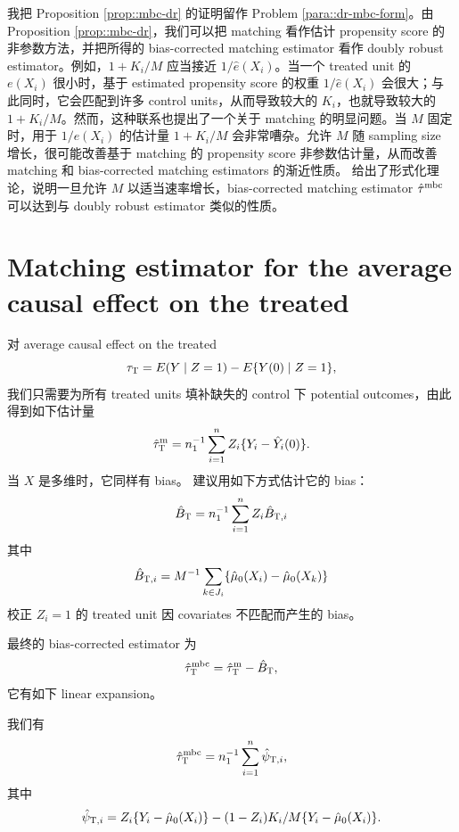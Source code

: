 我把 Proposition \ref{prop::mbc-dr} 的证明留作 Problem \ref{para::dr-mbc-form}。由 Proposition \ref{prop::mbc-dr}，我们可以把 matching 看作估计 propensity score 的非参数方法，并把所得的 bias-corrected matching estimator 看作 doubly robust estimator。例如，$1+K_i /  M$ 应当接近 $1/\hat{e}(X_i)$。当一个 treated unit 的 $e(X_i)$ 很小时，基于 estimated propensity score 的权重 $1/\hat{e}(X_i)$ 会很大；与此同时，它会匹配到许多 control units，从而导致较大的 $K_i$，也就导致较大的 $1+K_i /  M$。然而，这种联系也提出了一个关于 matching 的明显问题。当 $M$ 固定时，用于 $1/e(X_i)$ 的估计量 $1+K_i /  M$ 会非常嘈杂。允许 $M$ 随 sampling size 增长，很可能改善基于 matching 的 propensity score 非参数估计量，从而改善 matching 和 bias-corrected matching estimators 的渐近性质。\citet{lin2023estimation} 给出了形式化理论，说明一旦允许 $M$ 以适当速率增长，bias-corrected matching estimator $\hat{\tau}^\textup{mbc}   $ 可以达到与 doubly robust estimator 类似的性质。


 
 
 \section{Matching estimator for the average causal effect on the treated}

 
对 average causal effect on the treated
$$
\tau_\textsc{T} = E(Y\mid Z=1) - E\{  Y(0)  \mid Z=1\},
$$ 
我们只需要为所有 treated units 填补缺失的 control 下 potential outcomes，由此得到如下估计量
$$
\hat{\tau}_\textsc{T}^\textup{m} = n_1^{-1} \sum_{i=1}^n Z_i \{  Y_i - \hat{Y}_i(0) \}.
$$
当 $X$ 是多维时，它同样有 bias。
\citet{otsu2017bootstrap} 建议用如下方式估计它的 bias：
$$  
\hat{B}_\textsc{T} = n_1^{-1} \sum_{i=1}^n Z_i  \hat{B}_{\textsc{T},i} 
$$
其中
$$
\hat{B}_{\textsc{T},i} = M^{-1} \sum_{k \in J_i} \{  \hat{\mu}_0(X_i) -  \hat{\mu}_0(X_k)     \}
$$
校正 $Z_i = 1$ 的 treated unit 因 covariates 不匹配而产生的 bias。


最终的 bias-corrected estimator 为
$$
\hat{\tau}_\textsc{T}^\textup{mbc} = \hat{\tau}_\textsc{T}^\textup{m} - \hat{B}_\textsc{T},
$$ 
它有如下 linear expansion。

\begin{proposition}\label{prop::linear-expansion-att}
我们有
\begin{eqnarray}\label{eq::linearATT}
\hat{\tau}_\textsc{T}^\textup{mbc}  =   n_1^{-1} \sum_{i=1}^n \hat{\psi}_{\textsc{T}, i},
\end{eqnarray}
其中
$$
\hat{\psi}_{\textsc{T}, i} =   Z_i \{ Y_i - \hat{\mu}_0(X_i) \}
- (1-Z_i) K_i/M \{ Y_i - \hat{\mu}_0(X_i) \} . 
$$
\end{proposition}

